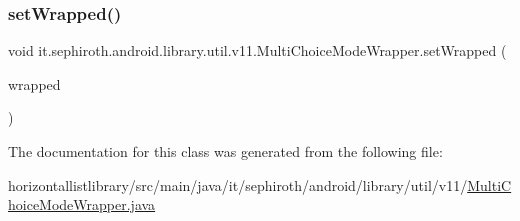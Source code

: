 \subsubsection{\texorpdfstring{set\+Wrapped()}{setWrapped()}}
{\footnotesize\ttfamily void it.\+sephiroth.\+android.\+library.\+util.\+v11.\+Multi\+Choice\+Mode\+Wrapper.\+set\+Wrapped (\begin{DoxyParamCaption}\item[{\hyperlink{interfaceit_1_1sephiroth_1_1android_1_1library_1_1util_1_1v11_1_1_multi_choice_mode_listener}{Multi\+Choice\+Mode\+Listener}}]{wrapped }\end{DoxyParamCaption})}



The documentation for this class was generated from the following file\+:\begin{DoxyCompactItemize}
\item 
horizontallistlibrary/src/main/java/it/sephiroth/android/library/util/v11/\hyperlink{_multi_choice_mode_wrapper_8java}{Multi\+Choice\+Mode\+Wrapper.\+java}\end{DoxyCompactItemize}
